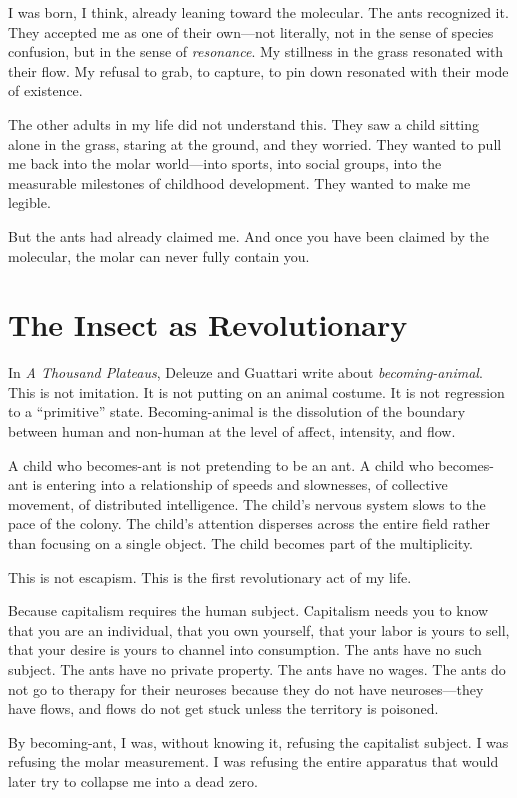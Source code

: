 \documentclass[11pt,openany]{book}
\begin{document}
I was born, I think, already leaning toward the molecular. The ants recognized it. They accepted me as one of their own---not literally, not in the sense of species confusion, but in the sense of \textit{resonance}. My stillness in the grass resonated with their flow. My refusal to grab, to capture, to pin down resonated with their mode of existence.

The other adults in my life did not understand this. They saw a child sitting alone in the grass, staring at the ground, and they worried. They wanted to pull me back into the molar world---into sports, into social groups, into the measurable milestones of childhood development. They wanted to make me legible.

But the ants had already claimed me. And once you have been claimed by the molecular, the molar can never fully contain you.

\section*{The Insect as Revolutionary}

In \textit{A Thousand Plateaus}, Deleuze and Guattari write about \textit{becoming-animal}. This is not imitation. It is not putting on an animal costume. It is not regression to a ``primitive'' state. Becoming-animal is the dissolution of the boundary between human and non-human at the level of affect, intensity, and flow.

A child who becomes-ant is not pretending to be an ant. A child who becomes-ant is entering into a relationship of speeds and slownesses, of collective movement, of distributed intelligence. The child's nervous system slows to the pace of the colony. The child's attention disperses across the entire field rather than focusing on a single object. The child becomes part of the multiplicity.

This is not escapism. This is the first revolutionary act of my life.

Because capitalism requires the human subject. Capitalism needs you to know that you are an individual, that you own yourself, that your labor is yours to sell, that your desire is yours to channel into consumption. The ants have no such subject. The ants have no private property. The ants have no wages. The ants do not go to therapy for their neuroses because they do not have neuroses---they have flows, and flows do not get stuck unless the territory is poisoned.

By becoming-ant, I was, without knowing it, refusing the capitalist subject. I was refusing the molar measurement. I was refusing the entire apparatus that would later try to collapse me into a dead zero.
\end{document}
